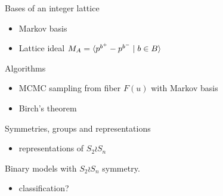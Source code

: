\documentclass[12pt]{article}
\begin{document}
\noindent Bases of an integer lattice
\begin{itemize}\nospace
\item Markov basis
\item Lattice ideal $M_A = \langle p^{b^+} - p^{b^-} \mid b \in B\rangle$
\end{itemize}

\noindent Algorithms
\begin{itemize}\nospace
\item MCMC sampling from fiber $F(u)$ with Markov basis
\item Birch's theorem
\end{itemize}

\noindent Symmetries, groups and representations
\begin{itemize}\nospace
\item representations of $S_2 \wr S_n$
\end{itemize}

\noindent Binary models with $S_2 \wr S_n$ symmetry.
\begin{itemize}\nospace
\item classification?
\end{itemize}
\end{document}
